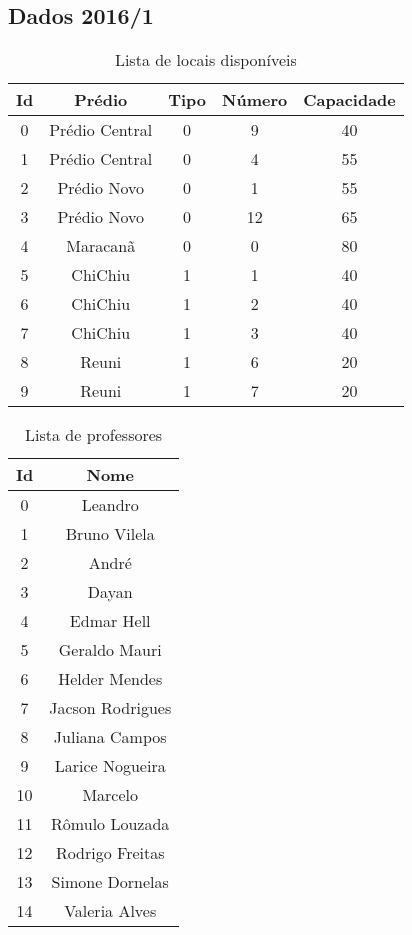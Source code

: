 \begin{apendices}
\section{Dados 2016/1}
\label{dados_2016}

\begin{table}[H]
\footnotesize
\centering
\begin{tabular}{|c|c|c|c|c|}
\hline
\textbf{Id} & \textbf{Prédio} & \textbf{Tipo} & \textbf{Número} & \textbf{Capacidade} \\ \hline
0 & Prédio Central & 0 & 9 & 40 \\ \hline
1 & Prédio Central & 0 & 4 & 55 \\ \hline
2 & Prédio Novo & 0 & 1 & 55 \\ \hline
3 & Prédio Novo & 0 & 12 & 65 \\ \hline
4 & Maracanã & 0 & 0 & 80 \\ \hline
5 & ChiChiu & 1 & 1 & 40 \\ \hline
6 & ChiChiu & 1 & 2 & 40 \\ \hline
7 & ChiChiu & 1 & 3 & 40 \\ \hline
8 & Reuni & 1 & 6 & 20 \\ \hline
9 & Reuni & 1 & 7 & 20 \\ \hline
\end{tabular}
\caption{Lista de locais disponíveis}
\label{ap-lista-locais}
\end{table}

\begin{table}[H]
\footnotesize
\centering
\begin{tabular}{|c|c|}
\hline
\textbf{Id} & \textbf{Nome} \\ \hline
0 & Leandro \\ \hline
1 & Bruno Vilela \\ \hline
2 & André \\ \hline
3 & Dayan \\ \hline
4 & Edmar Hell \\ \hline
5 & Geraldo Mauri \\ \hline
6 & Helder Mendes \\ \hline
7 & Jacson Rodrigues \\ \hline
8 & Juliana Campos \\ \hline
9 & Larice Nogueira \\ \hline
10 & Marcelo \\ \hline
11 & Rômulo Louzada \\ \hline
12 & Rodrigo Freitas \\ \hline
13 & Simone Dornelas \\ \hline
14 & Valeria Alves \\ \hline
\end{tabular}
\caption{Lista de professores}
\label{ap-lista-prof}
\end{table}


\end{apendices}
